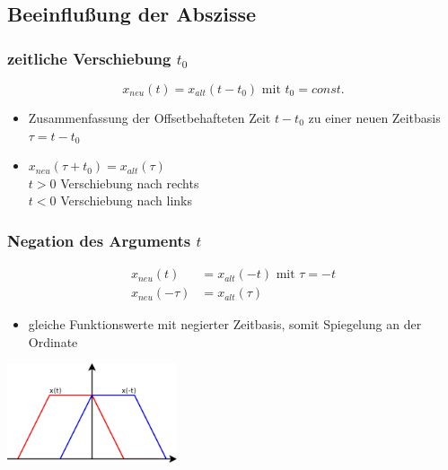 \subsection{Beeinflußung der Abszisse}
\begin{multicols}{2}
 \subsubsection{zeitliche Verschiebung \texorpdfstring{$t_0$}{}}
  \begin{equation*}
   x_{neu}\left(t\right) = x_{alt}\left(t - t_0\right) \text{ mit } t_0 = const.
  \end{equation*}
  \begin{itemize}
   \item Zusammenfassung der Offsetbehafteten Zeit \(t - t_0\) zu einer neuen Zeitbasis \(\tau = t - t_0\)
   \item \(x_{neu}\left(\tau + t_0\right) = x_{alt}\left(\tau\right) \) \\
         \(t > 0\) Verschiebung nach rechts\\
	 	 \(t < 0\) Verschiebung nach links
  \end{itemize}
 \vspace*{10mm} 
  \begin{center}
  
  \end{center}
 \vfill
\end{multicols}

\begin{multicols}{2}
 \subsubsection{Negation des Arguments \texorpdfstring{$t$}{}}
  \begin{align*}
   x_{neu}\left(t\right) &= x_{alt}\left(-t\right) \text{ mit } \tau = -t \\
   x_{neu}\left(-\tau\right) &= x_{alt}\left(\tau\right)
  \end{align*}
  \begin{itemize}
   \item gleiche Funktionswerte mit negierter Zeitbasis, somit Spiegelung an der Ordinate
  \end{itemize}

\vfill
  \begin{center}
  \includegraphics[width=50mm,keepaspectratio=true]{./Elektrotechnik/Bilder/argument.pdf}
  \end{center}
\end{multicols}

